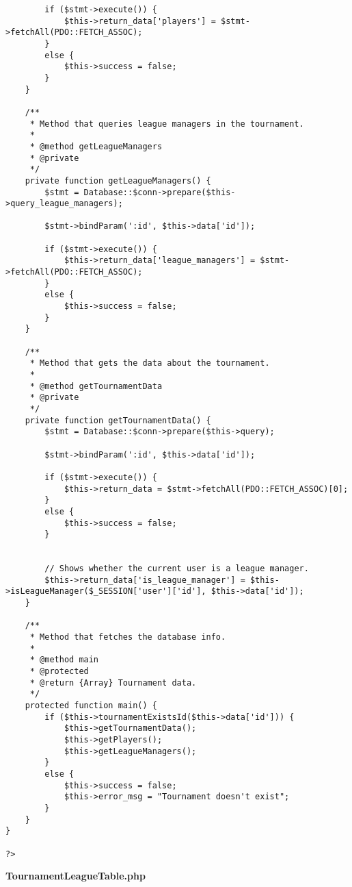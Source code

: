 {\begin{lstlisting}
		if ($stmt->execute()) {
			$this->return_data['players'] = $stmt->fetchAll(PDO::FETCH_ASSOC);
		}
		else {
			$this->success = false;
		}
	}

	/**
	 * Method that queries league managers in the tournament.
	 *
	 * @method getLeagueManagers
	 * @private
	 */
	private function getLeagueManagers() {
		$stmt = Database::$conn->prepare($this->query_league_managers);

		$stmt->bindParam(':id', $this->data['id']);

		if ($stmt->execute()) {
			$this->return_data['league_managers'] = $stmt->fetchAll(PDO::FETCH_ASSOC);
		}
		else {
			$this->success = false;
		}
	}

	/**
	 * Method that gets the data about the tournament.
	 *
	 * @method getTournamentData
	 * @private
	 */
	private function getTournamentData() {
		$stmt = Database::$conn->prepare($this->query);

		$stmt->bindParam(':id', $this->data['id']);

		if ($stmt->execute()) {
			$this->return_data = $stmt->fetchAll(PDO::FETCH_ASSOC)[0];
		}
		else {
			$this->success = false;
		}


		// Shows whether the current user is a league manager.
		$this->return_data['is_league_manager'] = $this->isLeagueManager($_SESSION['user']['id'], $this->data['id']);
	}

	/**
	 * Method that fetches the database info.
	 *
	 * @method main
	 * @protected
	 * @return {Array} Tournament data.
	 */
	protected function main() {
		if ($this->tournamentExistsId($this->data['id'])) {
			$this->getTournamentData();
			$this->getPlayers();
			$this->getLeagueManagers();
		}
		else {
			$this->success = false;
			$this->error_msg = "Tournament doesn't exist";
		}
	}
}

?>\end{lstlisting}
}
\textbf{TournamentLeagueTable.php}\label{TournamentLeagueTable.php}


